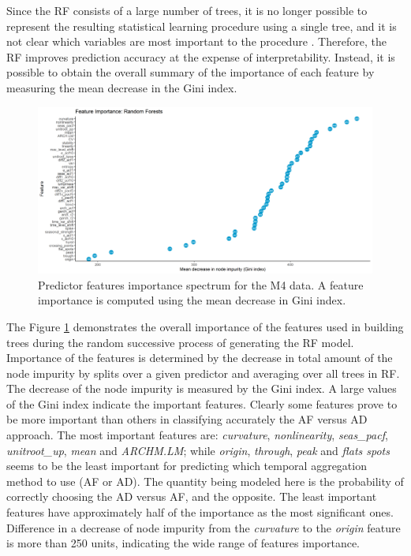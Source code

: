 \documentclass[]{elsarticle} %
\begin{document}
Since the RF consists of a large number of trees, it is no longer
possible to represent the resulting statistical learning procedure using
a single tree, and it is not clear which variables are most important to
the procedure \citep{james2013introduction}. Therefore, the RF improves
prediction accuracy at the expense of interpretability. Instead, it is
possible to obtain the overall summary of the importance of each feature
by measuring the mean decrease in the Gini index.

\begin{figure}[H]

{\centering \includegraphics[width=0.95\linewidth]{img/300dpi/Fig_importance} 

}

\caption{Predictor features importance spectrum for the M4 data. A feature importance is computed using the mean decrease in Gini index.}\label{fig:RFpartial}
\end{figure}

The Figure \ref{fig:RFpartial} demonstrates the overall importance of
the features used in building trees during the random successive process
of generating the RF model. Importance of the features is determined by
the decrease in total amount of the node impurity by splits over a given
predictor and averaging over all trees in RF. The decrease of the node
impurity is measured by the Gini index. A large values of the Gini index
indicate the important features. Clearly some features prove to be more
important than others in classifying accurately the AF versus AD
approach. The most important features are: \emph{curvature},
\emph{nonlinearity}, \emph{seas\_pacf}, \emph{unitroot\_up}, \emph{mean}
and \emph{ARCHM.LM}; while \emph{origin}, \emph{through}, \emph{peak}
and \emph{flats spots} seems to be the least important for predicting
which temporal aggregation method to use (AF or AD). The quantity being
modeled here is the probability of correctly choosing the AD versus AF,
and the opposite. The least important features have approximately half
of the importance as the most significant ones. Difference in a decrease
of node impurity from the \emph{curvature} to the \emph{origin} feature
is more than 250 units, indicating the wide range of features
importance.
\end{document}
